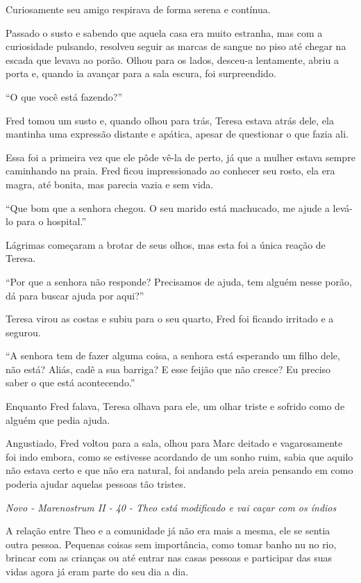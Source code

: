 Curiosamente seu amigo respirava de forma serena e contínua.

Passado o susto e sabendo que aquela casa era muito estranha, mas com a
curiosidade pulsando, resolveu seguir as marcas de sangue no piso até
chegar na escada que levava ao porão. Olhou para os lados, desceu-a
lentamente, abriu a porta e, quando ia avançar para a sala escura, foi
surpreendido.

``O que você está fazendo?''

Fred tomou um susto e, quando olhou para trás, Teresa estava atrás dele,
ela mantinha uma expressão distante e apática, apesar de questionar o
que fazia ali.

Essa foi a primeira vez que ele pôde vê-la de perto, já que a mulher
estava sempre caminhando na praia. Fred ficou impressionado ao conhecer
seu rosto, ela era magra, até bonita, mas parecia vazia e sem vida.

``Que bom que a senhora chegou. O seu marido está machucado, me ajude a
levá-lo para o hospital.''

Lágrimas começaram a brotar de seus olhos, mas esta foi a única reação
de Teresa.

``Por que a senhora não responde? Precisamos de ajuda, tem alguém nesse
porão, dá para buscar ajuda por aqui?''

Teresa virou as costas e subiu para o seu quarto, Fred foi ficando
irritado e a segurou.

``A senhora tem de fazer alguma coisa, a senhora está esperando um filho
dele, não está? Aliás, cadê a sua barriga? E esse feijão que não cresce?
Eu preciso saber o que está acontecendo.''

Enquanto Fred falava, Teresa olhava para ele, um olhar triste e sofrido
como de alguém que pedia ajuda.

Angustiado, Fred voltou para a sala, olhou para Marc deitado e
vagarosamente foi indo embora, como se estivesse acordando de um sonho
ruim, sabia que aquilo não estava certo e que não era natural, foi
andando pela areia pensando em como poderia ajudar aquelas pessoas tão
tristes.

\asterisc

\emph{Novo - Marenostrum II - 40 - Theo está modificado e vai caçar com
os índios}

A relação entre Theo e a comunidade já não era mais a mesma, ele se
sentia outra pessoa. Pequenas coisas sem importância, como tomar banho
nu no rio, brincar com as crianças ou até entrar nas casas pessoas e
participar das suas vidas agora já eram parte do seu dia a dia.

